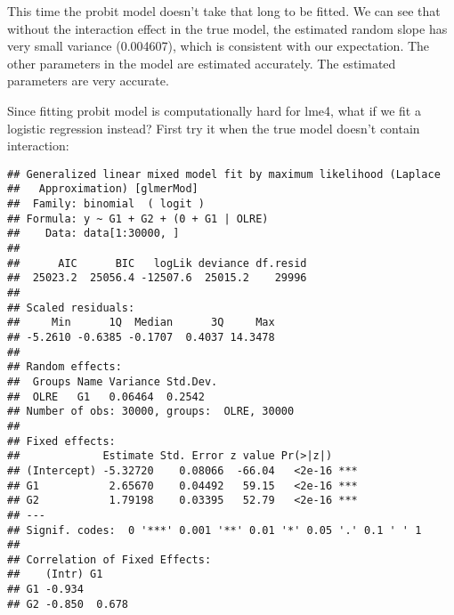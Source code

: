 \documentclass[]{article}
\newenvironment{Shaded}{\begin{snugshade}}{\end{snugshade}}
\newcommand{\DataTypeTok}[1]{\textcolor[rgb]{0.13,0.29,0.53}{#1}}
\newcommand{\DecValTok}[1]{\textcolor[rgb]{0.00,0.00,0.81}{#1}}
\newcommand{\KeywordTok}[1]{\textcolor[rgb]{0.13,0.29,0.53}{\textbf{#1}}}
\newcommand{\NormalTok}[1]{#1}
\newcommand{\OperatorTok}[1]{\textcolor[rgb]{0.81,0.36,0.00}{\textbf{#1}}}
\newcommand{\StringTok}[1]{\textcolor[rgb]{0.31,0.60,0.02}{#1}}
\begin{document}
This time the probit model doesn't take that long to be fitted. We can
see that without the interaction effect in the true model, the estimated
random slope has very small variance (0.004607), which is consistent
with our expectation. The other parameters in the model are estimated
accurately. The estimated parameters are very accurate.

Since fitting probit model is computationally hard for lme4, what if we
fit a logistic regression instead? First try it when the true model
doesn't contain interaction:

\begin{Shaded}
\end{Shaded}

\begin{verbatim}
## Generalized linear mixed model fit by maximum likelihood (Laplace
##   Approximation) [glmerMod]
##  Family: binomial  ( logit )
## Formula: y ~ G1 + G2 + (0 + G1 | OLRE)
##    Data: data[1:30000, ]
## 
##      AIC      BIC   logLik deviance df.resid 
##  25023.2  25056.4 -12507.6  25015.2    29996 
## 
## Scaled residuals: 
##     Min      1Q  Median      3Q     Max 
## -5.2610 -0.6385 -0.1707  0.4037 14.3478 
## 
## Random effects:
##  Groups Name Variance Std.Dev.
##  OLRE   G1   0.06464  0.2542  
## Number of obs: 30000, groups:  OLRE, 30000
## 
## Fixed effects:
##             Estimate Std. Error z value Pr(>|z|)    
## (Intercept) -5.32720    0.08066  -66.04   <2e-16 ***
## G1           2.65670    0.04492   59.15   <2e-16 ***
## G2           1.79198    0.03395   52.79   <2e-16 ***
## ---
## Signif. codes:  0 '***' 0.001 '**' 0.01 '*' 0.05 '.' 0.1 ' ' 1
## 
## Correlation of Fixed Effects:
##    (Intr) G1    
## G1 -0.934       
## G2 -0.850  0.678
\end{verbatim}
\end{document}

